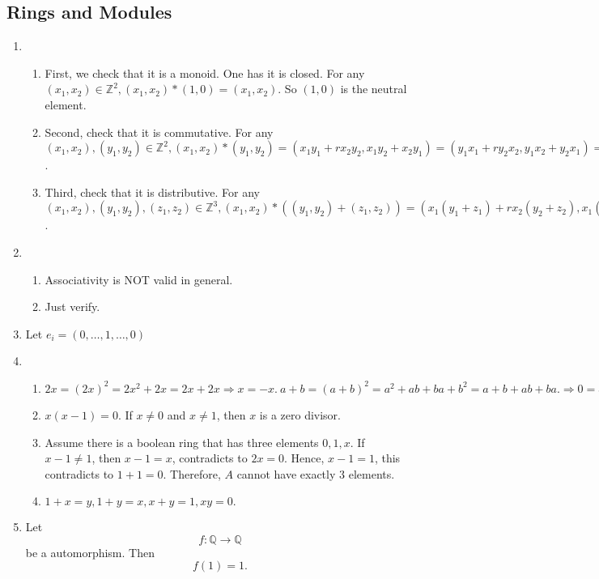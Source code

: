 \documentclass[12pt]{article}
\newcommand{\ZZ}{\mathbb{Z}}
\newcommand{\QQ}{\mathbb{Q}}
\begin{document}
\subsection{Rings and Modules}
\begin{enumerate}
    \item 
        \begin{enumerate}
            \item First, we check that it is a monoid. \newline One has it is closed. For any $(x_1,x_2)\in \ZZ^2, (x_1,x_2)*(1,0)=(x_1,x_2)$. So $(1,0)$ is the neutral element.
            \item Second, check that it is commutative. \newline For any $(x_1,x_2),(y_1,y_2)\in \ZZ^2, (x_1,x_2)*(y_1,y_2)=(x_1y_1+rx_2y_2,x_1y_2+x_2y_1)=(y_1x_1+ry_2x_2,y_1x_2+y_2x_1)=(y_1,y_2)*(x_1,x_2)$.
            \item Third, check that it is distributive. \newline For any $(x_1,x_2),(y_1,y_2),(z_1,z_2)\in \ZZ^3, (x_1,x_2)*((y_1,y_2)+(z_1,z_2))=(x_1(y_1+z_1)+rx_2(y_2+z_2),x_1(y_2+z_2)+x_2(y_1+z_1))=(x_1,x_2)*(y_1,y_2)+(x_1,x_2)*(z_1,z_2)$. 
        \end{enumerate}
    \item
        \begin{enumerate}
            \item Associativity is NOT valid in general.
            \item Just verify.
        \end{enumerate}
    \item Let $e_i=(0,\dots,1,\dots,0)$
    \item 
        \begin{enumerate}
            \item $2x=(2x)^2=2x^2+2x=2x+2x\Rightarrow x=-x.\ a+b=(a+b)^2=a^2+ab+ba+b^2=a+b+ab+ba.\Rightarrow 0=ab+ba=ab-ba\Rightarrow ab=ba.$
            \item $x(x-1)=0$. If $x\not=0$ and $x\not=1$, then $x$ is a zero divisor.
            \item Assume there is a boolean ring that has three elements $0,1,x$. If $x-1\not=1$, then $x-1=x$, contradicts to $2x=0$. Hence, $x-1=1$, this contradicts to $1+1=0$. Therefore, $A$ cannot have exactly $3$ elements.
            \item $1+x=y,1+y=x,x+y=1,xy=0.$
        \end{enumerate}
    \item Let $$f:\QQ\longrightarrow \QQ$$ be a automorphism. Then $$f(1)=1.$$

\end{enumerate}
\end{document}

